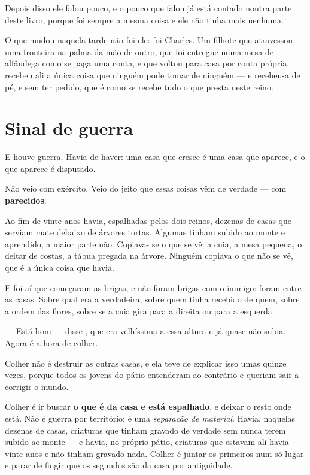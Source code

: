 \documentclass[livro.tex]{subfiles}
\begin{document}
\medskip

Depois disso ele falou pouco, e o pouco que falou já está contado noutra parte deste livro,
porque foi sempre a mesma coisa e ele não tinha mais nenhuma.

O que mudou naquela tarde não foi ele: foi Charles. Um filhote que atravessou uma fronteira na
palma da mão de outro, que foi entregue numa mesa de alfândega como se paga uma conta, e que
voltou para casa por conta própria, recebeu ali a única coisa que ninguém pode tomar de
ninguém --- e recebeu-a de pé, e sem ter pedido, que é como se recebe tudo o que presta neste
reino.

\section{Sinal de guerra}

E houve guerra. Havia de haver: uma casa que cresce é uma casa que aparece, e o que aparece é
disputado.

Não veio com exército. Veio do jeito que essas coisas vêm de verdade --- com \textbf{parecidos}.

\medskip

Ao fim de vinte anos havia, espalhadas pelos dois reinos, dezenas de casas que serviam mate
debaixo de árvores tortas. Algumas tinham subido ao monte e aprendido; a maior parte não. Copiava-
se o que se vê: a cuia, a mesa pequena, o deitar de costas, a tábua pregada na árvore. Ninguém
copiava o que não se vê, que é a única coisa que havia.

E foi aí que começaram as brigas, e não foram brigas com o inimigo: foram entre as casas. Sobre
qual era a verdadeira, sobre quem tinha recebido de quem, sobre a ordem das flores, sobre se a
cuia gira para a direita ou para a esquerda.

--- Está bom --- disse \Qui , que era velhíssima a essa altura e já quase não subia. --- Agora é
a hora de colher.

\medskip

Colher não é destruir as outras casas, e ela teve de explicar isso umas quinze vezes, porque
todos os jovens do pátio entenderam ao contrário e queriam sair a corrigir o mundo.

Colher é ir buscar \textbf{o que é da casa e está espalhado}, e deixar o resto onde está. Não é
guerra por território: é uma \emph{separação de material}. Havia, naquelas dezenas de casas,
criaturas que tinham gravado de verdade sem nunca terem subido ao monte --- e havia, no próprio
pátio, criaturas que estavam ali havia vinte anos e não tinham gravado nada. Colher é juntar os
primeiros num só lugar e parar de fingir que os segundos são da casa por antiguidade.
\end{document}
